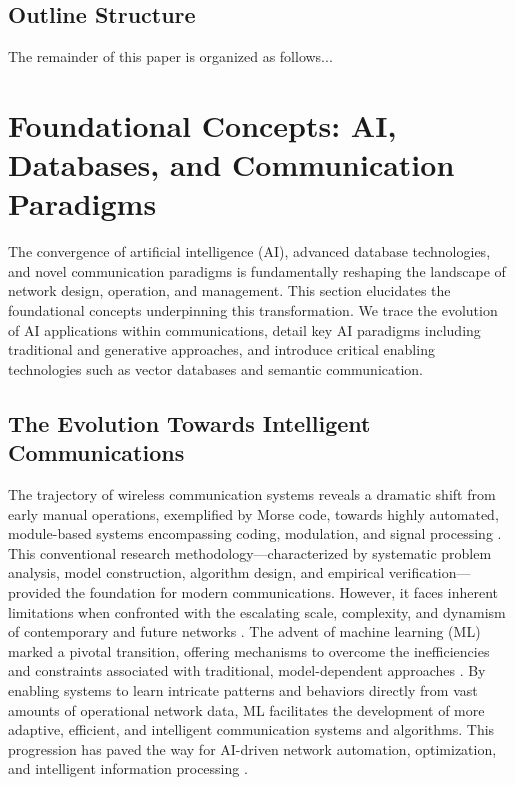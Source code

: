 \documentclass[sigconf]{acmart}
\begin{document}
\subsection{Outline Structure}
\label{sec:intro_outline}

The remainder of this paper is organized as follows...

\section{Foundational Concepts: AI, Databases, and Communication Paradigms}

The convergence of artificial intelligence (AI), advanced database technologies, and novel communication paradigms is fundamentally reshaping the landscape of network design, operation, and management. This section elucidates the foundational concepts underpinning this transformation. We trace the evolution of AI applications within communications, detail key AI paradigms including traditional and generative approaches, and introduce critical enabling technologies such as vector databases and semantic communication.

\subsection{The Evolution Towards Intelligent Communications}

The trajectory of wireless communication systems reveals a dramatic shift from early manual operations, exemplified by Morse code, towards highly automated, module-based systems encompassing coding, modulation, and signal processing \cite{ref32}. This conventional research methodology—characterized by systematic problem analysis, model construction, algorithm design, and empirical verification—provided the foundation for modern communications. However, it faces inherent limitations when confronted with the escalating scale, complexity, and dynamism of contemporary and future networks \cite{ref32}. The advent of machine learning (ML) marked a pivotal transition, offering mechanisms to overcome the inefficiencies and constraints associated with traditional, model-dependent approaches \cite{ref32}. By enabling systems to learn intricate patterns and behaviors directly from vast amounts of operational network data, ML facilitates the development of more adaptive, efficient, and intelligent communication systems and algorithms. This progression has paved the way for AI-driven network automation, optimization, and intelligent information processing \cite{ref1, ref32}.
\end{document}
